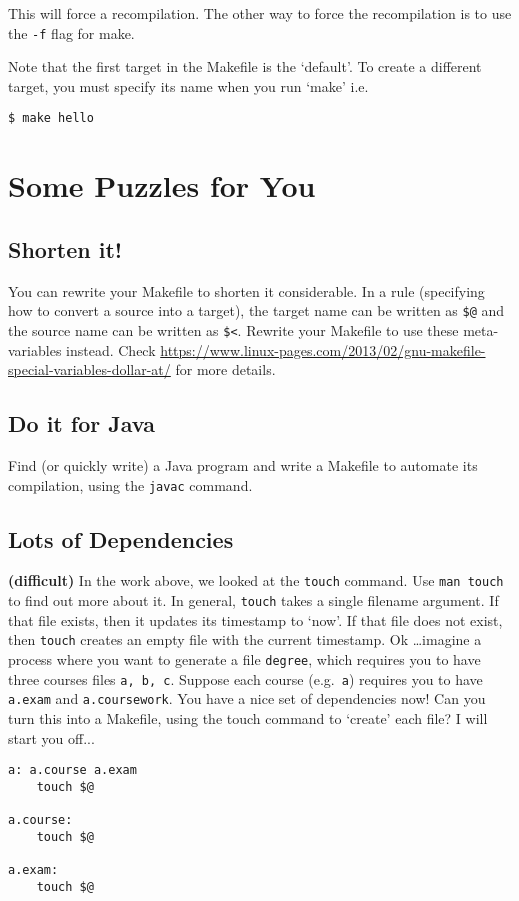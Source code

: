 \documentclass{article}
\begin{document}
This will force a recompilation. The other way to force the recompilation is to use the \texttt{-f} flag for make. 

Note that the first target in the Makefile is the `default'. To create a different target, you must specify its name when you run `make' i.e.
\begin{lstlisting}[style=BashInputStyle]
    $ make hello
\end{lstlisting}

\section*{Some Puzzles for You}

\subsection{Shorten it!}
You can rewrite your Makefile to shorten it considerable. In a rule (specifying how to convert a source into a target), the target name can be written as \verb+$@+ and the source name can be written as \verb+$<+. Rewrite your Makefile to use these meta-variables instead. Check \url{https://www.linux-pages.com/2013/02/gnu-makefile-special-variables-dollar-at/} for more details.

\subsection{Do it for Java}
Find (or quickly write) a Java program and write a Makefile to automate its compilation, using the \texttt{javac} command.

\subsection{Lots of Dependencies}
\textbf{(difficult)} In the work above, we looked at the \texttt{touch} command. Use \texttt{man touch} to find out more about it. In general, \texttt{touch} takes a single filename argument. If that file exists, then it updates its timestamp to `now'. If that file does not exist, then \texttt{touch} creates an empty file with the current timestamp. Ok \ldots imagine a process where you want to generate a file \texttt{degree}, which requires you to have three courses files \texttt{a, b, c}. Suppose each course (e.g.\ \texttt{a}) requires you to have \texttt{a.exam} and \texttt{a.coursework}. You have a nice set of dependencies now!  Can you turn this into a Makefile, using the touch command to `create' each file? I will start you off...


\begin{lstlisting}[style=MakeProg]
a: a.course a.exam
    touch $@

a.course:
    touch $@

a.exam:
    touch $@

\end{lstlisting}
\end{document}
